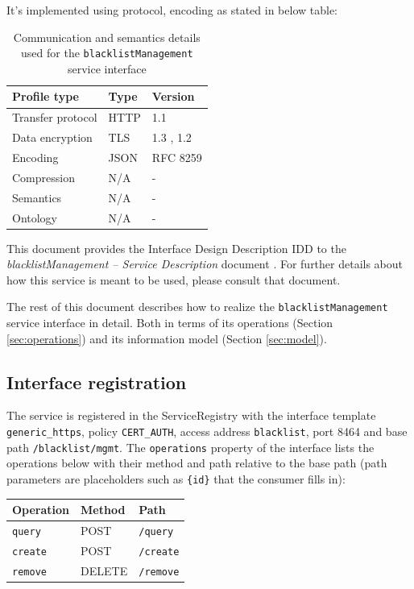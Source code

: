 \documentclass[a4paper]{arrowhead}
\begin{document}
It's implemented using protocol, encoding as stated in below table:
\begin{table}[ht!]
  \centering
  \begin{tabular}{|l|l|l|}
    \hline
    \rowcolor{gray!33} Profile type & Type & Version \\ \hline
    Transfer protocol & HTTP & 1.1 \cite{rfc9112} \\ \hline
    Data encryption & TLS & 1.3 \cite{rfc8446}, 1.2 \cite{rfc5246} \\ \hline
    Encoding & JSON & RFC 8259 \cite{rfc8259} \\ \hline
    Compression & N/A & - \\ \hline
    Semantics & N/A & - \\ \hline
    Ontology & N/A & - \\ \hline
  \end{tabular}
  \caption{Communication and semantics details used for the \texttt{blacklist\allowbreak{}Management} service interface}
  \label{tab:comunication_semantics_profile}
\end{table}

This document provides the Interface Design Description IDD to the \textit{blacklistManagement -- Service Description} document \cite{bl-blacklistManagement-sd}.
For further details about how this service is meant to be used, please consult that document.

The rest of this document describes how to realize the \texttt{blacklist\allowbreak{}Management} service
interface in detail. Both in terms of its operations (Section \ref{sec:operations}) and its information model (Section \ref{sec:model}).

\subsection{Interface registration}

The service is registered in the ServiceRegistry with the interface template \texttt{generic\_\allowbreak{}https}, policy \texttt{CERT\_\allowbreak{}AUTH}, access address \texttt{blacklist}, port 8464 and base path \texttt{/\allowbreak{}blacklist/\allowbreak{}mgmt}. The \texttt{operations} property of the interface lists the operations below with their method and path relative to the base path (path parameters are placeholders such as \texttt{\{id\}} that the consumer fills in):

\noindent\begin{longtable}{| p{5.2cm} | p{1.6cm} | p{8.4cm} |} \hline
\rowcolor{gray!33} Operation & Method & Path \\ \hline \endhead
\texttt{query} & POST & \texttt{/\allowbreak{}query} \\ \hline
\texttt{create} & POST & \texttt{/\allowbreak{}create} \\ \hline
\texttt{remove} & DELETE & \texttt{/\allowbreak{}remove} \\ \hline
\end{longtable}
\end{document}
